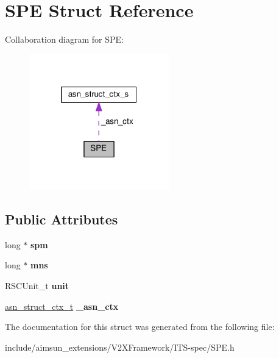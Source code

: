 \hypertarget{structSPE}{}\section{S\+PE Struct Reference}
\label{structSPE}


Collaboration diagram for S\+PE\+:\nopagebreak
\begin{figure}[H]
\begin{center}
\leavevmode
\includegraphics[width=172pt]{structSPE__coll__graph}
\end{center}
\end{figure}
\subsection*{Public Attributes}
\begin{DoxyCompactItemize}
\item 
long $\ast$ {\bfseries spm}\hypertarget{structSPE_aecbaece5d8f8779facb9537e0fa57d46}{}\label{structSPE_aecbaece5d8f8779facb9537e0fa57d46}

\item 
long $\ast$ {\bfseries mns}\hypertarget{structSPE_aa3ebf7d3a29f9f48a1b3980d49f9f55b}{}\label{structSPE_aa3ebf7d3a29f9f48a1b3980d49f9f55b}

\item 
R\+S\+C\+Unit\+\_\+t {\bfseries unit}\hypertarget{structSPE_ae2002ac8feef592831ae5839e6baf0b2}{}\label{structSPE_ae2002ac8feef592831ae5839e6baf0b2}

\item 
\hyperlink{structasn__struct__ctx__s}{asn\+\_\+struct\+\_\+ctx\+\_\+t} {\bfseries \+\_\+asn\+\_\+ctx}\hypertarget{structSPE_a2978e8fa8033182e11df27d201ea1a56}{}\label{structSPE_a2978e8fa8033182e11df27d201ea1a56}

\end{DoxyCompactItemize}


The documentation for this struct was generated from the following file\+:\begin{DoxyCompactItemize}
\item 
include/aimsun\+\_\+extensions/\+V2\+X\+Framework/\+I\+T\+S-\/spec/S\+P\+E.\+h\end{DoxyCompactItemize}
